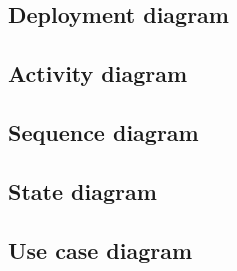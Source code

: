 \documentclass{article}
\begin{document}
		\subsection{Deployment diagram}
		\subsection{Activity diagram}
		\subsection{Sequence diagram}
		\subsection{State diagram}
		\subsection{Use case diagram}
\end{document}
